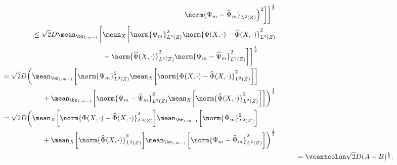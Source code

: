 {\begin{align*}
\begin{split}
                    \norm{ \Psi_{ m } - \hat{ \Psi }_{ m } }_{ L^2 ( Z ) }
                \Big)^2
            \bigg]
        \bigg]^{ \frac{ 1 }{ 2 } }
    \end{split} \\
    \begin{split}
        &\hspace{1cm}
        \leq \sqrt{ 2 } D \mean_{ \bz_{ 1:m-1 } } \bigg[
            \mean_{ X } \bigg[
                \norm{ \Psi_{ m } }_{ L^2 ( Z ) }^2
                \norm{ \Phi ( X, \cdot ) - \hat{ \Phi } ( X, \cdot ) }_{ L^2 ( Z ) }^2 \\
    &\hspace{4.5cm}
                + \norm{ \hat{ \Phi } ( X, \cdot ) }_{ L^2 ( Z ) }^2
                \norm{ \Psi_{ m } - \hat{ \Psi }_{ m } }_{ L^2 ( Z ) }^2
            \bigg]
        \bigg]^{ \frac{ 1 }{ 2 } }
    \end{split} \\
    \begin{split}
        &\hspace{1cm}
        = \sqrt{ 2 } D \bigg(
            \mean_{ \bz_{ 1:m-1 } } \bigg[
                \norm{ \Psi_{ m } }_{ L^2 ( Z ) }^2
                \mean_{ X } \bigg[
                    \norm{ \Phi ( X, \cdot )
                    - \hat{ \Phi } ( X, \cdot ) }_{ L^2 ( Z ) }^2
                \bigg] 
            \bigg] \\
        &\hspace{3cm}
            + \mean_{ \bz_{ 1:m-1 } } \bigg[
                    \norm{ \Psi_{ m } - \hat{ \Psi }_{ m } }_{ L^2 ( Z ) }^2
                    \mean_{ X } \bigg[
                        \norm{ \hat{ \Phi } ( X, \cdot ) }_{ L^2 ( Z ) }^2
                    \bigg]
                \bigg]
        \bigg)^{ \frac{ 1 }{ 2 } }
    \end{split} \\
    \begin{split}
        &\hspace{1cm}
        = \sqrt{ 2 } D \bigg(
            \mean_{ X } \bigg[
                \norm{ \Phi ( X, \cdot )
                - \hat{ \Phi } ( X, \cdot ) }_{ L^2 ( Z ) }^2
            \bigg] 
            \mean_{ \bz_{ 1:m-1 } } \bigg[
                \norm{ \Psi_{ m } }_{ L^2 ( Z ) }^2
            \bigg] \\
        &\hspace{3cm}
            + \mean_{ X } \bigg[
                \norm{ \hat{ \Phi } ( X, \cdot ) }_{ L^2 ( Z ) }^2
            \bigg]
            \mean_{ \bz_{ 1:m-1 } } \bigg[
                    \norm{ \Psi_{ m } - \hat{ \Psi }_{ m } }_{ L^2 ( Z ) }^2
                \bigg]
        \bigg)^{ \frac{ 1 }{ 2 } }
    \end{split} \\
    &\hspace{1cm}
    =\vcentcolon \sqrt{ 2 } D ( A + B )^{ \frac{ 1 }{ 2 } }
.\end{align*}
}
